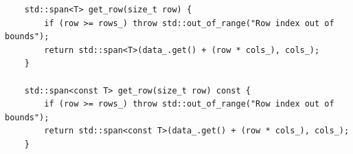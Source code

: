 \begin{verbatim}
    std::span<T> get_row(size_t row) {
        if (row >= rows_) throw std::out_of_range("Row index out of bounds");
        return std::span<T>(data_.get() + (row * cols_), cols_);
    }
    
    std::span<const T> get_row(size_t row) const {
        if (row >= rows_) throw std::out_of_range("Row index out of bounds");
        return std::span<const T>(data_.get() + (row * cols_), cols_);
    }
\end{verbatim}
